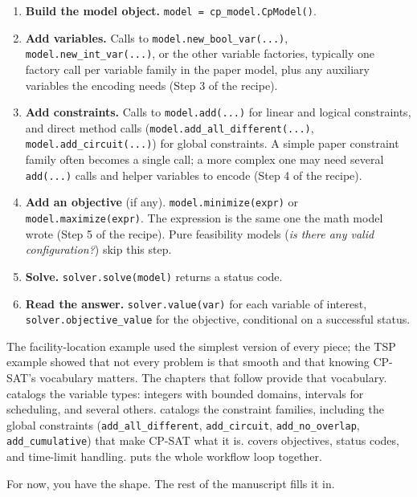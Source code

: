 \begin{enumerate}
\item
  \textbf{Build the model object.}
  \lstinline!model = cp_model.CpModel()!.
\item
  \textbf{Add variables.} Calls to
  \lstinline!model.new_bool_var(...)!,
  \lstinline!model.new_int_var(...)!, or the other
  variable factories, typically one factory call per variable family
  in the paper model, plus any auxiliary variables the encoding needs
  (Step 3 of the recipe).
\item
  \textbf{Add constraints.} Calls to
  \lstinline!model.add(...)! for linear and logical
  constraints, and direct method calls
  (\lstinline!model.add_all_different(...)!,
  \lstinline!model.add_circuit(...)!) for global
  constraints. A simple paper constraint family often becomes a single
  call; a more complex one may need several
  \lstinline!add(...)! calls and helper variables to
  encode (Step 4 of the recipe).
\item
  \textbf{Add an objective} (if any).
  \lstinline!model.minimize(expr)! or
  \lstinline!model.maximize(expr)!. The expression is the
  same one the math model wrote (Step 5 of the recipe). Pure feasibility
  models (\emph{is there any valid configuration?}) skip this
  step.
\item
  \textbf{Solve.} \lstinline!solver.solve(model)! returns
  a status code.
\item
  \textbf{Read the answer.} \lstinline!solver.value(var)!
  for each variable of interest,
  \lstinline!solver.objective_value! for the objective,
  conditional on a successful status.
\end{enumerate}

The facility-location example used the simplest version of every piece;
the TSP example showed that not every problem is that smooth and that
knowing CP-SAT's vocabulary matters. The chapters that follow provide
that vocabulary.  catalogs the variable types: integers with
bounded domains, intervals for scheduling, and several others. 
catalogs the constraint families, including the global constraints
(\lstinline!add_all_different!,
\lstinline!add_circuit!,
\lstinline!add_no_overlap!,
\lstinline!add_cumulative!) that make CP-SAT what it is.
 covers objectives, status codes, and time-limit handling.
 puts the whole workflow loop together.

For now, you have the shape. The rest of the manuscript fills it in.
